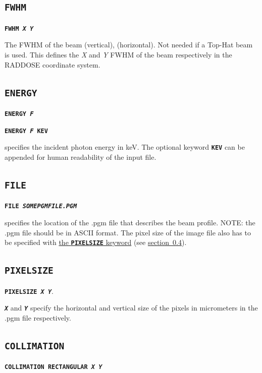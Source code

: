 \documentclass[a4paper]{article}
\newcommand{\Keyword}[1]{\texttt{\textbf{#1}}\xspace}
\newcommand{\SB}{\\[0.2em]}
\begin{document}
\subsection{\Keyword{FWHM}}

\label{beamfwhm}
\noindent \Keyword{FWHM \textit{X Y}}

The FWHM of the beam (vertical), (horizontal). Not needed if a Top-Hat beam is used.
This defines the \textit{X} and \textit{Y} FWHM of the beam respectively in the RADDOSE coordinate system.


\subsection{\Keyword{ENERGY}}

\noindent \Keyword{ENERGY \textit{F}}

\noindent \Keyword{ENERGY \textit{F} KEV}

specifies the incident photon energy in keV. The optional keyword \Keyword{KEV} can be appended for human readability of the input file.

\subsection{\Keyword{FILE}}
\label{file}

\noindent \Keyword{FILE \textit{SOMEPGMFILE.PGM}}

specifies the location of the .pgm file that describes the beam profile. NOTE: the .pgm file should be in ASCII format. The pixel size of the image file also has to be specified with \hyperref[pixelsize]{the \Keyword{PIXELSIZE} keyword} (see \hyperref[pixelsize]{section~\ref*{pixelsize}}).\SB

\subsection{\Keyword{PIXELSIZE}}
\label{pixelsize}

\noindent \Keyword{PIXELSIZE \textit{X Y}}.

\Keyword{\textit{X}} and \Keyword{\textit{Y}} specify the horizontal and vertical size of the pixels in micrometers in the .pgm file respectively.

\subsection{\Keyword{COLLIMATION}}

\noindent \Keyword{COLLIMATION RECTANGULAR \textit{X Y}}
\end{document}
